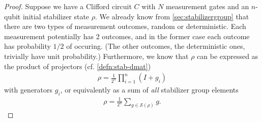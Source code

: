 \begin{proof}
Suppose we have a Clifford circuit $C$ with $N$ measurement gates and an
$n$-qubit initial stabilizer state $\rho$. We already
know from \cref{sec:stabilizergroup} that there are two types of measurement
outcomes, random or deterministic. Each measurement potentially has 2 outcomes,
and in the former case each outcome has probability $1 / 2$ of occuring. (The
other outcomes, the deterministic ones, trivially have unit probability.)
Furthermore, we know that $\rho$ can be expressed as the product of projectors
(cf. \cref{defn:stab-dmat})
\begin{align}
  \rho = \frac{1}{2^n} \prod_{i=1}^n (I + g_i)
\end{align}
with generators $g_i$,
or equivalently as a sum of \emph{all} stabilizer group elements
\begin{align}
  \rho = \frac{1}{2^n} \sum_{g\in \mathcal{S}(\rho)} g
.\end{align}


\end{proof}
